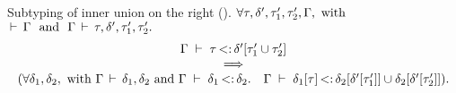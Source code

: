 \begin{lemma}{Subtyping of inner union on the right
    (\textbf{}).}%
\label{lem:sub-inner-union-right:app}
    $\forall \tau, \delta', \tau'_1, \tau'_2, \Gamma, \text{ with }$\\
    $\tyvld{}{\AEnv}\ \text{ and }\ \tyvlddflt{\ty, \dctx', \ty'_1, \ty'_2}.$
    \[
        \begin{array}{ccc}
        \Gamma\;\vdash\;\tau \operatorname{<:} \delta'[\tau'_1 \cup \tau'_2]\\
        \quad\implies\quad\\
        (\forall \delta_1, \delta_2, \text{ with }
        \Gamma\,\vdash\,\delta_1, \delta_2 \text{ and }
        \Gamma\;\vdash\;\delta_1 \operatorname{<:} \delta_2.\quad
        \Gamma\;\vdash\;\delta_1[\tau] \operatorname{<:} \delta_2[\delta'[\tau'_1]] \cup \delta_2[\delta'[\tau'_2]]
            ).
        \end{array}
    \]
\end{lemma}
